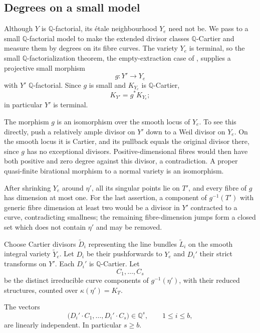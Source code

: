 \subsection{Degrees on a small model}

Although $Y$ is $\mathbb Q$-factorial, its \'etale neighbourhood
$Y_e$ need not be.  We pass to a small $\mathbb Q$-factorial model
to make the extended divisor classes $\mathbb Q$-Cartier and measure
them by degrees on its fibre curves.  The variety $Y_e$ is terminal,
so the small
$\mathbb Q$-factorialization theorem, the empty-extraction case of
\cite[Corollary~1.4.3]{BCHM}, supplies a projective small morphism
\[
 g:Y'\longrightarrow Y_e
\]
with $Y'$ $\mathbb Q$-factorial.  Since $g$ is small and $K_{Y_e}$
is $\mathbb Q$-Cartier,
\begin{equation}\label{eq:local-small-crepant}
 K_{Y'}=g^*K_{Y_e};
\end{equation}
in particular $Y'$ is terminal.

The morphism $g$ is an isomorphism over the smooth locus of $Y_e$.
To see this directly, push a relatively ample divisor on $Y'$ down
to a Weil divisor on $Y_e$.  On the smooth locus it is Cartier, and
its pullback equals the original divisor there, since $g$ has no
exceptional divisors.  Positive-dimensional fibres would then have
both positive and zero degree against this divisor, a contradiction.
A proper quasi-finite birational morphism to a normal variety is an
isomorphism.

After shrinking $Y_e$ around $\eta'$, all its singular points lie
on $T'$, and every fibre of $g$ has dimension at most one.  For the
last assertion, a component of $g^{-1}(T')$ with generic fibre
dimension at least two would be a divisor in $Y'$ contracted to a
curve, contradicting smallness; the remaining fibre-dimension jumps
form a closed set which does not contain $\eta'$ and may be removed.

Choose Cartier divisors $\widetilde D_i$ representing the line
bundles $\widetilde L_i$ on the smooth integral variety
$\widetilde Y_e$.  Let $D_i$ be their pushforwards to $Y_e$ and
$D_i'$ their strict transforms on $Y'$.  Each $D_i'$ is
$\mathbb Q$-Cartier.  Let
\[
 C_1,\ldots,C_s
\]
be the distinct irreducible curve components of $g^{-1}(\eta')$,
with their reduced structures, counted over
$\kappa(\eta')=K_T$.

\begin{lemma}\label{local:degree-independence}
The vectors
\[
 \bigl(D_i'\cdot C_1,\ldots,D_i'\cdot C_s\bigr)
       \in\mathbb Q^s,\qquad 1\leq i\leq b,
\]
are linearly independent.  In particular $s\geq b$.
\end{lemma}


